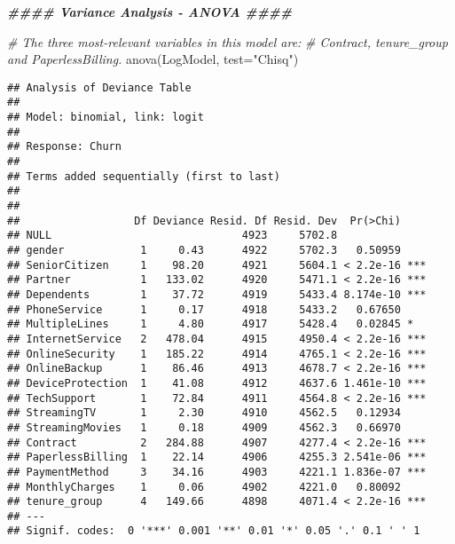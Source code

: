 \documentclass[
]{article}
\newenvironment{Shaded}{\begin{snugshade}}{\end{snugshade}}
\newcommand{\AttributeTok}[1]{\textcolor[rgb]{0.77,0.63,0.00}{#1}}
\newcommand{\CommentTok}[1]{\textcolor[rgb]{0.56,0.35,0.01}{\textit{#1}}}
\newcommand{\DocumentationTok}[1]{\textcolor[rgb]{0.56,0.35,0.01}{\textbf{\textit{#1}}}}
\newcommand{\FunctionTok}[1]{\textcolor[rgb]{0.00,0.00,0.00}{#1}}
\newcommand{\NormalTok}[1]{#1}
\newcommand{\StringTok}[1]{\textcolor[rgb]{0.31,0.60,0.02}{#1}}
\begin{document}
\begin{Shaded}
\begin{Highlighting}[]
\DocumentationTok{\#\#\#\# Variance Analysis {-} ANOVA \#\#\#\#}

\CommentTok{\# The three most{-}relevant variables in this model are:}
\CommentTok{\# \textquotesingle{}Contract\textquotesingle{}, \textquotesingle{}tenure\_group\textquotesingle{} and \textquotesingle{}PaperlessBilling.\textquotesingle{}}
\FunctionTok{anova}\NormalTok{(LogModel, }\AttributeTok{test=}\StringTok{"Chisq"}\NormalTok{)}
\end{Highlighting}
\end{Shaded}

\begin{verbatim}
## Analysis of Deviance Table
## 
## Model: binomial, link: logit
## 
## Response: Churn
## 
## Terms added sequentially (first to last)
## 
## 
##                  Df Deviance Resid. Df Resid. Dev  Pr(>Chi)    
## NULL                              4923     5702.8              
## gender            1     0.43      4922     5702.3   0.50959    
## SeniorCitizen     1    98.20      4921     5604.1 < 2.2e-16 ***
## Partner           1   133.02      4920     5471.1 < 2.2e-16 ***
## Dependents        1    37.72      4919     5433.4 8.174e-10 ***
## PhoneService      1     0.17      4918     5433.2   0.67650    
## MultipleLines     1     4.80      4917     5428.4   0.02845 *  
## InternetService   2   478.04      4915     4950.4 < 2.2e-16 ***
## OnlineSecurity    1   185.22      4914     4765.1 < 2.2e-16 ***
## OnlineBackup      1    86.46      4913     4678.7 < 2.2e-16 ***
## DeviceProtection  1    41.08      4912     4637.6 1.461e-10 ***
## TechSupport       1    72.84      4911     4564.8 < 2.2e-16 ***
## StreamingTV       1     2.30      4910     4562.5   0.12934    
## StreamingMovies   1     0.18      4909     4562.3   0.66970    
## Contract          2   284.88      4907     4277.4 < 2.2e-16 ***
## PaperlessBilling  1    22.14      4906     4255.3 2.541e-06 ***
## PaymentMethod     3    34.16      4903     4221.1 1.836e-07 ***
## MonthlyCharges    1     0.06      4902     4221.0   0.80092    
## tenure_group      4   149.66      4898     4071.4 < 2.2e-16 ***
## ---
## Signif. codes:  0 '***' 0.001 '**' 0.01 '*' 0.05 '.' 0.1 ' ' 1
\end{verbatim}
\end{document}
